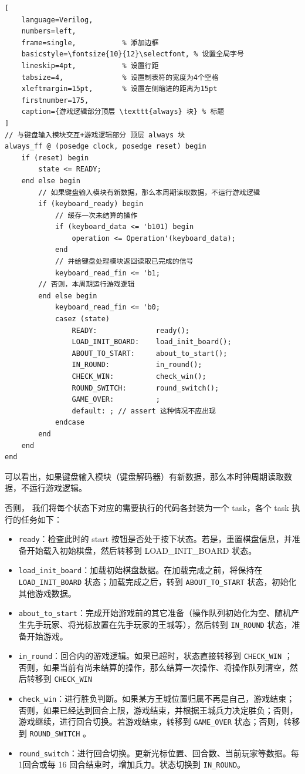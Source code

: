 \begin{lstlisting}[
    language=Verilog,
    numbers=left,
    frame=single,           % 添加边框
    basicstyle=\fontsize{10}{12}\selectfont, % 设置全局字号
    lineskip=4pt,           % 设置行距
    tabsize=4,              % 设置制表符的宽度为4个空格
    xleftmargin=15pt,       % 设置左侧缩进的距离为15pt
    firstnumber=175,
    caption={游戏逻辑部分顶层 \texttt{always} 块} % 标题
] 
// 与键盘输入模块交互+游戏逻辑部分 顶层 always 块
always_ff @ (posedge clock, posedge reset) begin
    if (reset) begin
        state <= READY;
    end else begin
        // 如果键盘输入模块有新数据，那么本周期读取数据，不运行游戏逻辑
        if (keyboard_ready) begin
            // 缓存一次未结算的操作
            if (keyboard_data <= 'b101) begin
                operation <= Operation'(keyboard_data);
            end
            // 并给键盘处理模块返回读取已完成的信号
            keyboard_read_fin <= 'b1;
        // 否则，本周期运行游戏逻辑
        end else begin
            keyboard_read_fin <= 'b0;
            casez (state)
                READY:              ready();
                LOAD_INIT_BOARD:    load_init_board();
                ABOUT_TO_START:     about_to_start();
                IN_ROUND:           in_round();
                CHECK_WIN:          check_win();
                ROUND_SWITCH:       round_switch();
                GAME_OVER:          ;
                default: ; // assert 这种情况不应出现
            endcase
        end
    end
end
\end{lstlisting}

可以看出，如果键盘输入模块（键盘解码器）有新数据，那么本时钟周期读取数据，不运行游戏逻辑。

否则，
我们将每个状态下对应的需要执行的代码各封装为一个 task，各个 task 执行的任务如下：
\begin{itemize}
    \item \texttt{ready}：检查此时的 start 按钮是否处于按下状态。若是，重置棋盘信息，并准备开始载入初始棋盘，然后转移到 LOAD\_INIT\_BOARD 状态。
    \item \texttt{load\_init\_board}：加载初始棋盘数据。在加载完成之前，将保持在 \texttt{LOAD\_INIT\_BOARD} 状态；加载完成之后，转到 \texttt{ABOUT\_TO\_START} 状态，初始化其他游戏数据。
    \item \texttt{about\_to\_start}：完成开始游戏前的其它准备（操作队列初始化为空、随机产生先手玩家、将光标放置在先手玩家的王城等），然后转到 \texttt{IN\_ROUND} 状态，准备开始游戏。
    \item \texttt{in\_round}：回合内的游戏逻辑。如果已超时，状态直接转移到  \texttt{CHECK\_WIN} ；否则，如果当前有尚未结算的操作，那么结算一次操作、将操作队列清空，然后转移到 \texttt{CHECK\_WIN}
    \item \texttt{check\_win}：进行胜负判断。如果某方王城位置归属不再是自己，游戏结束；否则，如果已经达到回合上限，游戏结束，并根据王城兵力决定胜负；否则，游戏继续，进行回合切换。若游戏结束，转移到 \texttt{GAME\_OVER} 状态；否则，转移到 \texttt{ROUND\_SWITCH} 。
    \item \texttt{round\_switch}：进行回合切换。更新光标位置、回合数、当前玩家等数据。每1回合或每 16 回合结束时，增加兵力。状态切换到 \texttt{IN\_ROUND}。
\end{itemize}


